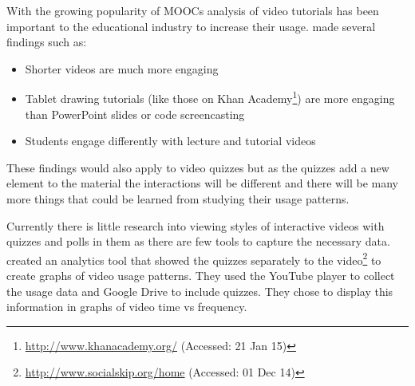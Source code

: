 With the growing popularity of \glspl{MOOC} analysis of video tutorials has been important to the educational industry to increase their usage.  \citep{engagement} made several findings such as:
\begin{itemize}
	\item Shorter videos are much more engaging
	\item Tablet drawing tutorials (like those on Khan Academy\footnote{\url{http://www.khanacademy.org/} (Accessed: 21 Jan 15)}) are more engaging than PowerPoint slides or code screencasting
	\item Students engage differently with lecture and tutorial videos
\end{itemize}
These findings would also apply to video quizzes but as the quizzes add a new element to the material the interactions will be different and there will be many more things that could be learned from studying their usage patterns.

Currently there is little research into viewing styles of interactive videos with quizzes and polls in them as there are few tools to capture the necessary data.  \citep{videoAnalytics} created an analytics tool that showed the quizzes separately to the video\footnote{\url{http://www.socialskip.org/home} (Accessed: 01 Dec 14)} to create graphs of video usage patterns. They used the YouTube player to collect the usage data and Google Drive to include quizzes. They chose to display this information in graphs of video time vs frequency.
